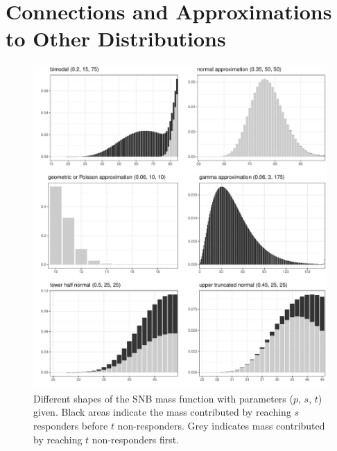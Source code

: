 \documentclass[sii]{ipart}
\begin{document}
\section{Connections and Approximations to Other Distributions}

\begin{figure}
\begin{center}
\includegraphics[width=\textwidth]{shapes.pdf}
\end{center}
\caption{Different shapes of the SNB mass function with parameters 
($p$, $s$, $t$) given. Black areas indicate the mass contributed by reaching
$s$ responders before $t$ non-responders. Grey indicates
mass contributed by reaching $t$ non-responders first. \label{shapes.fig}}
\end{figure}
\end{document}
